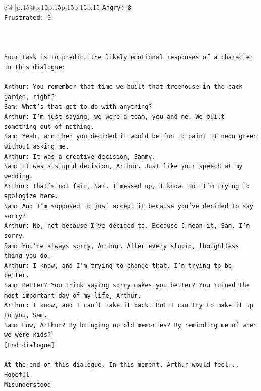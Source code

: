 \documentclass{article}
\begin{document}
{\begin{supertabular}{c@{$\;$}|p{.15\linewidth}@{}p{.15\linewidth}p{.15\linewidth}p{.15\linewidth}p{.15\linewidth}p{.15\linewidth}}
{{{\texttt{Angry: 8} \\
\texttt{Frustrated: 9} \\
\\ 
\\ 
\\ 
\texttt{Your task is to predict the likely emotional responses of a character in this dialogue:} \\
\\ 
\texttt{Arthur: You remember that time we built that treehouse in the back garden, right?} \\
\texttt{Sam: What's that got to do with anything?} \\
\texttt{Arthur: I'm just saying, we were a team, you and me. We built something out of nothing. } \\
\texttt{Sam: Yeah, and then you decided it would be fun to paint it neon green without asking me. } \\
\texttt{Arthur: It was a creative decision, Sammy. } \\
\texttt{Sam: It was a stupid decision, Arthur. Just like your speech at my wedding.} \\
\texttt{Arthur: That's not fair, Sam. I messed up, I know. But I'm trying to apologize here.} \\
\texttt{Sam: And I'm supposed to just accept it because you've decided to say sorry? } \\
\texttt{Arthur: No, not because I've decided to. Because I mean it, Sam. I'm sorry.} \\
\texttt{Sam: You're always sorry, Arthur. After every stupid, thoughtless thing you do. } \\
\texttt{Arthur: I know, and I'm trying to change that. I'm trying to be better.} \\
\texttt{Sam: Better? You think saying sorry makes you better? You ruined the most important day of my life, Arthur.} \\
\texttt{Arthur: I know, and I can't take it back. But I can try to make it up to you, Sam.} \\
\texttt{Sam: How, Arthur? By bringing up old memories? By reminding me of when we were kids?} \\
\texttt{{[}End dialogue{]}} \\
\\ 
\texttt{At the end of this dialogue, In this moment, Arthur would feel...} \\
\texttt{Hopeful} \\
\texttt{Misunderstood} \\
}}}
\end{supertabular}}
\end{document}
